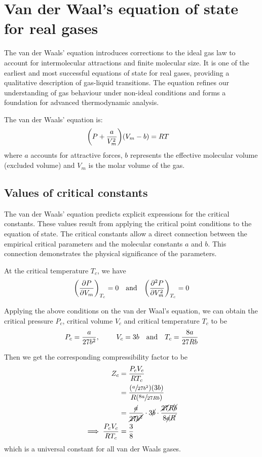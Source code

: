 \section{Van der Waal's equation of state for real gases}
	The van der Waals' equation introduces corrections to the ideal gas law to account for intermolecular attractions and finite molecular size. It is one of the earliest and most successful equations of state for real gases, providing a qualitative description of gas-liquid transitions. The equation refines our understanding of gas behaviour under non-ideal conditions and forms a foundation for advanced thermodynamic analysis.
	
	The van der Waals' equation is:
	\begin{align*}
		\qty(P+\dfrac{a}{V_m^2})\qty(V_m-b)&=RT
	\end{align*}
	where $a$ accounts for attractive forces, $b$ represents the effective molecular volume (excluded volume) and $V_m$ is the molar volume of the gas.
	
	\subsection{Values of critical constants}
		The van der Waals' equation predicts explicit expressions for the critical constants. These values result from applying the critical point conditions to the equation of state. The critical constants allow a direct connection between the empirical critical parameters and the molecular constants $a$ and $b$. This connection demonstrates the physical significance of the parameters.
		
		At the critical temperature $T_c$, we have
		\begin{align*}
			\qty(\pdv{P}{V_m})_{T_c}=0\qq{and}\qty(\pdv[2]{P}{V_m})_{T_c}=0
		\end{align*}
		
		Applying the above conditions on the van der Waal's equation, we can obtain the critical pressure $P_c$, critical volume $V_c$ and critical temperature $T_c$ to be
		\begin{align*}
			P_c=\dfrac{a}{27b^2},\qq{ }V_c=3b\qq{and}T_c=\dfrac{8a}{27Rb}
		\end{align*}
		
		Then we get the corresponding compressibility factor to be
		\begin{align*}
			Z_c&=\dfrac{P_cV_c}{RT_c} \\
			&=\dfrac{\qty(\sfrac{a}{27b^2})\qty(3b)}{R\qty(\sfrac{8a}{27Rb})} \\
			&=\dfrac{\cancel{a}}{\cancel{27}\cancel{b^2}}\cdot 3\cancel{b}\cdot\dfrac{\cancel{27}\cancel{R}\cancel{b}}{8\cancel{a}\cancel{R}} \\
			\implies\dfrac{P_cV_c}{RT_c}&=\dfrac{3}{8}
		\end{align*}
		which is a universal constant for all van der Waals gases.